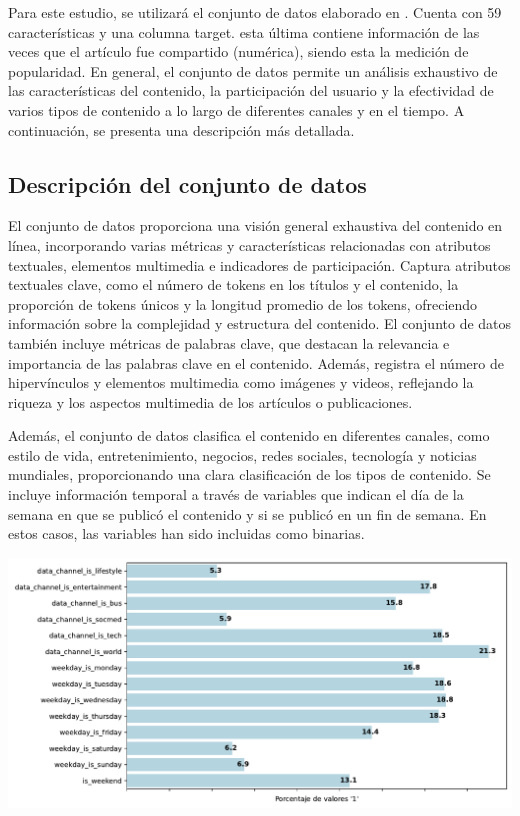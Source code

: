 \documentclass[
  number,
  preprint,
  3p,
  twocolumn]{elsarticle}
\begin{document}
Para este estudio, se utilizará el conjunto de datos elaborado en
\citep{fernandes2015}. Cuenta con 59 características y una columna
target. esta última contiene información de las veces que el artículo
fue compartido (numérica), siendo esta la medición de popularidad. En
general, el conjunto de datos permite un análisis exhaustivo de las
características del contenido, la participación del usuario y la
efectividad de varios tipos de contenido a lo largo de diferentes
canales y en el tiempo. A continuación, se presenta una descripción más
detallada.

\subsection{Descripción del conjunto de
datos}\label{descripciuxf3n-del-conjunto-de-datos}

El conjunto de datos proporciona una visión general exhaustiva del
contenido en línea, incorporando varias métricas y características
relacionadas con atributos textuales, elementos multimedia e indicadores
de participación. Captura atributos textuales clave, como el número de
tokens en los títulos y el contenido, la proporción de tokens únicos y
la longitud promedio de los tokens, ofreciendo información sobre la
complejidad y estructura del contenido. El conjunto de datos también
incluye métricas de palabras clave, que destacan la relevancia e
importancia de las palabras clave en el contenido. Además, registra el
número de hipervínculos y elementos multimedia como imágenes y videos,
reflejando la riqueza y los aspectos multimedia de los artículos o
publicaciones.

Además, el conjunto de datos clasifica el contenido en diferentes
canales, como estilo de vida, entretenimiento, negocios, redes sociales,
tecnología y noticias mundiales, proporcionando una clara clasificación
de los tipos de contenido. Se incluye información temporal a través de
variables que indican el día de la semana en que se publicó el contenido
y si se publicó en un fin de semana. En estos casos, las variables han
sido incluidas como binarias.

\includegraphics{index_files/figure-pdf/cell-4-output-1.pdf}
\end{document}
